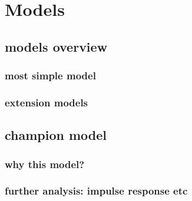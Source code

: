 \chapter{Models}\label{sec3}
\thispagestyle{empty}

\section{models overview}

\subsection{most simple model}

\subsection{extension models}

\section{champion model}

\subsection{why this model?}

\subsection{further analysis: impulse response etc}

\cleardoublepage
